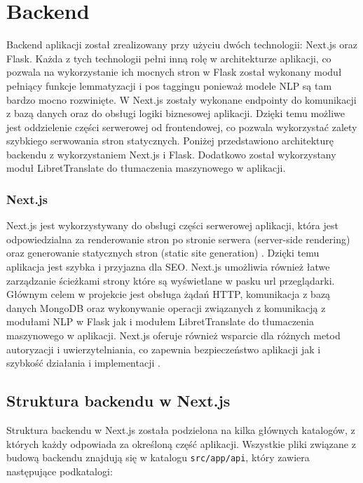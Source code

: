 
\section{Backend}
Backend aplikacji został zrealizowany przy użyciu dwóch technologii: Next.js oraz Flask. Każda z tych technologii pełni inną rolę w architekturze aplikacji, co pozwala na wykorzystanie ich mocnych stron w Flask został wykonany moduł pełniący funkcje lemmatyzacji i pos taggingu ponieważ modele NLP są tam bardzo mocno rozwinięte. W Next.js zostały wykonane endpointy do komunikacji z bazą danych oraz do obsługi logiki biznesowej aplikacji. Dzięki temu możliwe jest oddzielenie części serwerowej od frontendowej, co pozwala wykorzystać zalety szybkiego serwowania stron statycznych. Poniżej przedstawiono architekturę backendu z wykorzystaniem Next.js i Flask. Dodatkowo został wykorzystany moduł LibretTranslate do tłumaczenia maszynowego w aplikacji.

\subsubsection{Next.js}
Next.js jest wykorzystywany do obsługi części serwerowej aplikacji, która jest odpowiedzialna za renderowanie stron po stronie serwera (server-side rendering) oraz generowanie statycznych stron (static site generation) \cite{bui2023next}. Dzięki temu aplikacja jest szybka i przyjazna dla SEO. Next.js umożliwia również łatwe zarządzanie ścieżkami strony które są wyświetlane w pasku url przeglądarki. Głównym celem w projekcie jest obsługa żądań HTTP, komunikacja z bazą danych MongoDB oraz wykonywanie operacji związanych z komunikacją z modułami NLP w Flask jak i modułem LibretTranslate do tłumaczenia maszynowego w aplikacji. Next.js oferuje również wsparcie dla różnych metod autoryzacji i uwierzytelniania, co zapewnia bezpieczeństwo aplikacji jak i szybkość działania i implementacji \cite{bugl2024modern}.
\subsection{Struktura backendu w Next.js}
Struktura backendu w Next.js została podzielona na kilka głównych katalogów, z których każdy odpowiada za określoną część aplikacji. Wszystkie pliki związane z budową backendu znajdują się w katalogu \texttt{src/app/api}, który zawiera następujące podkatalogi:

